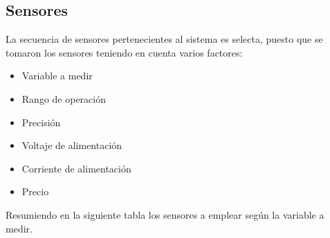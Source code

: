 
    \newpage

\subsection{Sensores} \label{sec: sensores}

    La secuencia de sensores pertenecientes al sistema es selecta, puesto que se tomaron los sensores teniendo en cuenta varios factores:

    \begin{itemize}
        \item Variable a medir
        \item Rango de operación
        \item Precisión
        \item Voltaje de alimentación
        \item Corriente de alimentación
        \item Precio
    \end{itemize}

    \vspace{1cm}

    Resumiendo en la siguiente tabla los sensores a emplear según la variable a medir.

